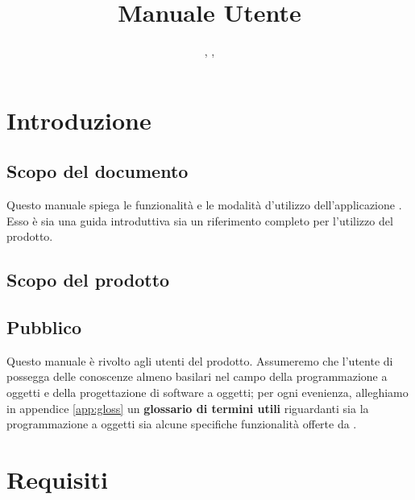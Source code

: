 


\author{\LB, \GG, \PB}
\supervisor{\PB}
\title{Manuale Utente}


\maketitle

\tableofcontents

\renewcommand{\gloss}[1]{#1}






\section{Introduzione}

\subsection{Scopo del documento}
Questo manuale spiega le funzionalità e le modalità d'utilizzo dell'applicazione \proj. Esso è sia una guida introduttiva sia un riferimento completo per l'utilizzo del prodotto.

\subsection{Scopo del prodotto}
\scopo

\subsection{Pubblico}
Questo manuale è rivolto agli utenti del prodotto. Assumeremo che l'utente di \proj{} possegga delle conoscenze almeno basilari nel campo della programmazione a oggetti e della progettazione di software a oggetti; per ogni evenienza, alleghiamo in appendice \ref{app:gloss} un \textbf{glossario di termini utili} riguardanti sia la programmazione a oggetti sia alcune specifiche funzionalità offerte da \proj.






\section{Requisiti} \label{sec:requisiti}

